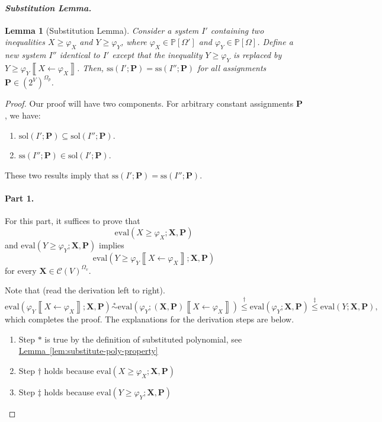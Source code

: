 \documentclass[10pt]{amsart}
\theoremstyle{plain}
\newtheorem{lemma}{Lemma}[section]
\theoremstyle{definition}
\providecommand{\namedref}[2]{\hyperref[#2]{#1~\ref*{#2}}\xspace}
\providecommand{\lemmaref}[1]{\namedref{Lemma}{lem:#1}}
\providecommand{\cC}[0]{\ensuremath{\mathcal C}\xspace}
\providecommand{\bP}[0]{\ensuremath{\mathbf P}\xspace}
\providecommand{\bX}[0]{\ensuremath{\mathbf X}\xspace}
\let\leq\leqslant
\let\geq\geqslant
\providecommand{\convset}[0]{\ensuremath{\cC}\xspace}
\providecommand{\sol}{\ensuremath{\mathrm{sol}}\xspace}
\providecommand{\ssol}{\ensuremath{\mathrm{ss}}\xspace}
\providecommand{\evalmap}[0]{\ensuremath{\mathrm{eval}}\xspace}
\begin{document}
\paragraph{\emph{Substitution Lemma.}}


\begin{lemma}[Substitution Lemma]\label{lem:substitute}
Consider a system $I'$ containing two inequalities $X\geq \varphi_X$ and $Y\geq \varphi_Y$, where $\varphi_X \in \mathbb{P}[\Omega']$ and $\varphi_Y \in \mathbb{P}[\Omega]$. 
Define a new system $I''$ identical to $I'$ except that the inequality 
$Y\geq \varphi_Y$ is replaced by $Y\geq \varphi_Y\left\llbracket X\gets\varphi_X \right\rrbracket$. 
Then, $\ssol(I';\bP)=\ssol(I'';\bP)$ for all assignments $\bP \in (2^V)^{\Omega_p}$. 
\end{lemma}
\begin{proof}
    Our proof will have two components. 
    For arbitrary constant assignments $\bP$, we have:
    \begin{enumerate}
        \item $\sol(I';\bP) \subseteq \sol(I'';\bP)$. 
        \item $\ssol(I'';\bP) \in \sol(I';\bP)$.
    \end{enumerate}
    These two results imply that $\ssol(I';\bP)=\ssol(I'';\bP)$. 

    \paragraph{Part 1.}
    For this part, it suffices to prove that 
    \[
    \evalmap\left(X\geq \varphi_X; \bX,\bP\right)
    \]
    and $\evalmap\left(Y\geq \varphi_Y; \bX,\bP\right)$ implies 
    \[
    \evalmap\left(Y\geq \varphi_Y\left\llbracket X\gets\varphi_X \right\rrbracket; \bX,\bP\right)
    \]
    for every $\bX \in \convset(V)^{\Omega_v}$.
    
    Note that (read the derivation left to right).
        $$\evalmap\left(\varphi_Y\left\llbracket X\gets\varphi_X \right\rrbracket; \bX,\bP\right) 
                \stackrel{*}{\sim} \evalmap\left(\varphi_Y ; (\bX,\bP)\left\llbracket X\gets \varphi_X\right\rrbracket \right) 
                \stackrel\dagger\leq \evalmap\left(\varphi_Y ; \bX,\bP\right) 
                \stackrel\ddagger\leq \evalmap\left(Y ; \bX,\bP\right),$$
    which completes the proof. 
    The explanations for the derivation steps are below.
    \begin{enumerate}
        \item Step $*$ is true by the definition of substituted polynomial, see \lemmaref{substitute-poly-property}
        \item Step $\dagger$ holds because $\evalmap\left(X\geq \varphi_X; \bX,\bP\right)$
        \item Step $\ddagger$ holds because $\evalmap\left(Y\geq \varphi_Y; \bX,\bP\right)$
    \end{enumerate}



\end{proof}
\end{document}

